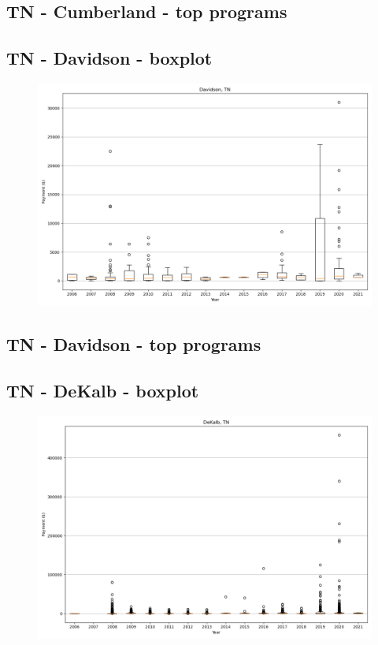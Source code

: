 \subsection*{TN - Cumberland - top programs}

\newpage
\subsection*{TN - Davidson - boxplot}
\begin{figure}[h]
\centering
\includegraphics[width=7in]{../output/boxplots/counties/Davidson-TN_boxplot.png}
\end{figure}


\subsection*{TN - Davidson - top programs}

\newpage
\subsection*{TN - DeKalb - boxplot}
\begin{figure}[h]
\centering
\includegraphics[width=7in]{../output/boxplots/counties/DeKalb-TN_boxplot.png}
\end{figure}


